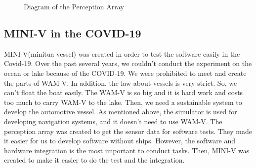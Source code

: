 \documentclass[lettersize,journal]{IEEEtran}
\begin{document}
\begin{figure}[htbp]
  \begin{center}
  \end{center}
  \caption{Diagram of the Perception Array}
  \label{fig:perception_aray_diagram}
\end{figure}


\subsection{MINI-V in the COVID-19}
MINI-V(minitua vessel) was created in order to test the software easily in the Covid-19. Over the past several years, 
we couldn't conduct the experiment on the ocean or lake because of the COVID-19.
We were prohibited to meet and create the parts of WAM-V.
In addition, the law about vessels is very strict.
So, we can't float the boat easily. The WAM-V is so big and it is hard work and costs too much to carry WAM-V to the lake. 
Then, we need a sustainable system to develop the automotive vessel.
As mentioned above, the simulator is used for developing navigation systems, and it doesn't need to use WAM-V.
The perception array was created to get the sensor data for software tests. They made it easier for us to develop software without ships.
However, the software and hardware integration is the most important to conduct tasks. Then, MINI-V was created 
to make it easier to do the test and the integration.
\end{document}
